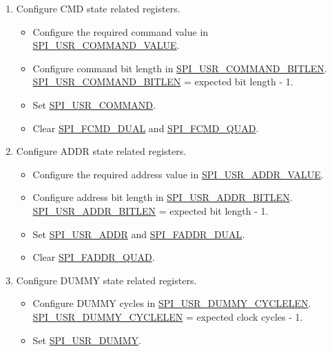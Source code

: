 \documentclass[main\_\_EN.tex]{subfiles}
\begin{document}
\begin{enumerate}
    \item Configure CMD state related registers.
        \begin{itemize}
            \item Configure the required command value in \hyperref[fielddesc:SPIUSRCOMMANDVALUE]{SPI\_USR\_COMMAND\_VALUE}.
            \item Configure command bit length in \hyperref[fielddesc:SPIUSRCOMMANDBITLEN]{SPI\_USR\_COMMAND\_BITLEN}. \hyperref[fielddesc:SPIUSRCOMMANDBITLEN]{SPI\_USR\_COMMAND\_BITLEN} = expected bit length - 1.
            \item Set \hyperref[fielddesc:SPIUSRCOMMAND]{SPI\_USR\_COMMAND}.
            \item Clear \hyperref[fielddesc:SPIFCMDDUAL]{SPI\_FCMD\_DUAL} and \hyperref[fielddesc:SPIFCMDQUAD]{SPI\_FCMD\_QUAD}.
        \end{itemize}

    \item Configure ADDR state related registers.
        \begin{itemize}
            \item Configure the required address value in \hyperref[fielddesc:SPIUSRADDRVALUE]{SPI\_USR\_ADDR\_VALUE}.
            \item Configure address bit length in \hyperref[fielddesc:SPIUSRADDRBITLEN]{SPI\_USR\_ADDR\_BITLEN}. \hyperref[fielddesc:SPIUSRADDRBITLEN]{SPI\_USR\_ADDR\_BITLEN} = expected bit length - 1.
            \item Set \hyperref[fielddesc:SPIUSRADDR]{SPI\_USR\_ADDR} and \hyperref[fielddesc:SPIFADDRDUAL]{SPI\_FADDR\_DUAL}.
            \item Clear \hyperref[fielddesc:SPIFADDRQUAD]{SPI\_FADDR\_QUAD}.
        \end{itemize}

    \item Configure DUMMY state related registers.
        \begin{itemize}
            \item Configure DUMMY cycles in \hyperref[fielddesc:SPIUSRDUMMYCYCLELEN]{SPI\_USR\_DUMMY\_CYCLELEN}. \hyperref[fielddesc:SPIUSRDUMMYCYCLELEN]{SPI\_USR\_DUMMY\_CYCLELEN} = expected clock cycles - 1.
            \item Set \hyperref[fielddesc:SPIUSRDUMMY]{SPI\_USR\_DUMMY}.
        \end{itemize}


\end{enumerate}
\end{document}
